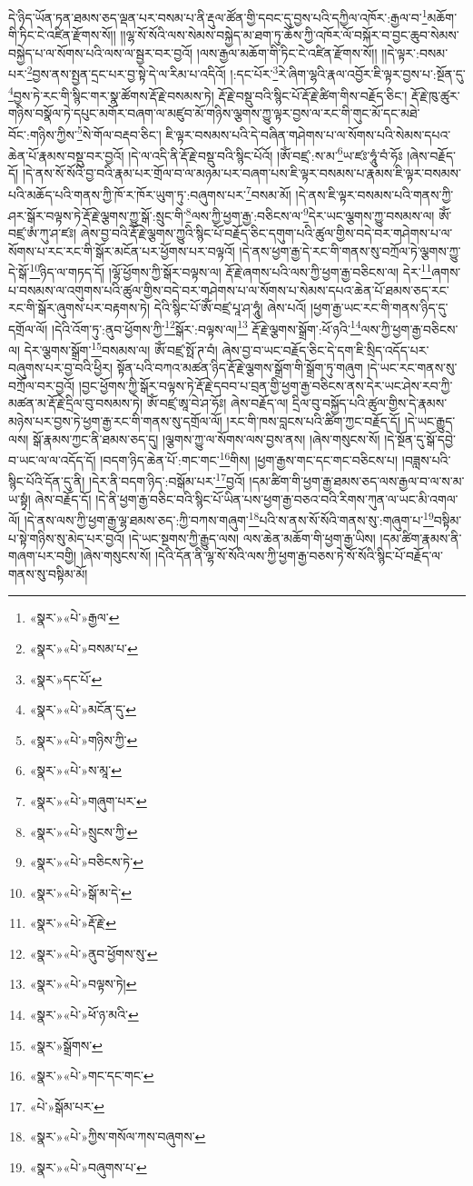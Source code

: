 དེ་ཉིད་ཡོན་ཏན་ཐམས་ཅད་ལྡན་པར་བསམ་པ་ནི་རྡུལ་ཚོན་གྱི་དབང་དུ་བྱས་པའི་དཀྱིལ་འཁོར་:རྒྱལ་བ་\footnote{«སྣར་»«པེ་»རྒྱལ་}མཆོག་གི་ཏིང་ངེ་འཛིན་རྫོགས་སོ།། །།ལྷ་སོ་སོའི་ལས་སེམས་བསྐྱེད་མ་ཐག་ཏུ་ཆོས་ཀྱི་འཁོར་ལོ་བསྐོར་བ་བྱང་ཆུབ་སེམས་བསྐྱེད་པ་ལ་སོགས་པའི་ལས་ལ་སྦྱར་བར་བྱའོ། །ལས་རྒྱལ་མཆོག་གི་ཏིང་ངེ་འཛིན་རྫོགས་སོ།། །།དེ་ལྟར་:བསམ་པར་\footnote{«སྣར་»«པེ་»བསམ་པ་}བྱས་ནས་སྤྱན་དྲང་པར་བྱ་སྟེ་དེ་ལ་རིམ་པ་འདིའོ། །:དང་པོར་\footnote{«སྣར་»དང་པོ་}རེ་ཞིག་ལྷའི་རྣལ་འབྱོར་ཇི་ལྟར་བྱས་པ་:སྔོན་དུ་\footnote{«སྣར་»«པེ་»མངོན་དུ་}བྱས་ཏེ་རང་གི་སྙིང་གར་སྣ་ཚོགས་རྡོ་རྗེ་བསམས་ཏེ། རྡོ་རྗེ་བསྡུ་བའི་སྙིང་པོ་རྡོ་རྗེ་ཚིག་གིས་བརྗོད་ཅིང་། རྡོ་རྗེ་ཁུ་ཚུར་གཉིས་བསྣོལ་ཏེ་དཔུང་མགོར་བཞག་ལ་མཛུབ་མོ་གཉིས་ལྕགས་ཀྱུ་ལྟར་བྱས་ལ་རང་གི་གུང་མོ་དང་མཐེ་བོང་:གཉིས་ཀྱིས་\footnote{«སྣར་»«པེ་»གཉིས་ཀྱི་}སེ་གོལ་བརྡབ་ཅིང་། ཇི་ལྟར་བསམས་པའི་དེ་བཞིན་གཤེགས་པ་ལ་སོགས་པའི་སེམས་དཔའ་ཆེན་པོ་རྣམས་བསྡུ་བར་བྱའོ། །དེ་ལ་འདི་ནི་རྡོ་རྗེ་བསྡུ་བའི་སྙིང་པོའོ། །ཨོཾ་བཛྲ་:ས་མ་\footnote{«སྣར་»«པེ་»ས་མཱ་}ཡ་ཛཿ་ཧཱུཾ་བཾ་ཧོཿ །ཞེས་བརྗོད་དོ། །དེ་ནས་སོ་སོའི་བྱ་བའི་རྣམ་པར་གྲོལ་བ་ལ་མཉམ་པར་བཞག་པས་ཇི་ལྟར་བསམས་པ་རྣམས་ཇི་ལྟར་བསམས་པའི་མཆོད་པའི་གནས་ཀྱི་ཁོ་ར་ཁོར་ཡུག་ཏུ་:བཞུགས་པར་\footnote{«སྣར་»«པེ་»གཞུག་པར་}བསམ་མོ། །དེ་ནས་ཇི་ལྟར་བསམས་པའི་གནས་ཀྱི་ཤར་སྒོར་བལྟས་ཏེ་རྡོ་རྗེ་ལྕགས་ཀྱུ་སྒོ་:སྲུང་གི་\footnote{«སྣར་»«པེ་»སྲུངས་ཀྱི་}ལས་ཀྱི་ཕྱག་རྒྱ་:བཅིངས་ལ་\footnote{«སྣར་»«པེ་»བཅིངས་ཏེ་}དེར་ཡང་ལྕགས་ཀྱུ་བསམས་ལ། ཨོཾ་བཛྲ་ཨཾ་ཀུ་ཤ་ཛཿ། ཞེས་བྱ་བའི་རྡོ་རྗེ་ལྕགས་ཀྱུའི་སྙིང་པོ་བརྗོད་ཅིང་དགུག་པའི་ཚུལ་གྱིས་བདེ་བར་གཤེགས་པ་ལ་སོགས་པ་རང་རང་གི་སྒོར་མངོན་པར་ཕྱོགས་པར་བལྟའོ། །དེ་ནས་ཕྱག་རྒྱ་དེ་རང་གི་གནས་སུ་བཀྲོལ་ཏེ་ལྕགས་ཀྱུ་དེ་སྒོ་\footnote{«སྣར་»«པེ་»སྒོ་མ་དེ་}ཉིད་ལ་གཏད་དོ། །ལྷོ་ཕྱོགས་ཀྱི་སྒོར་བལྟས་ལ། རྡོ་རྗེ་ཞགས་པའི་ལས་ཀྱི་ཕྱག་རྒྱ་བཅིངས་ལ། དེར་\footnote{«སྣར་»«པེ་»རྡོ་རྗེ་}ཞགས་པ་བསམས་ལ་འགུགས་པའི་ཚུལ་གྱིས་བདེ་བར་གཤེགས་པ་ལ་སོགས་པ་སེམས་དཔའ་ཆེན་པོ་ཐམས་ཅད་རང་རང་གི་སྒོར་ཞུགས་པར་བརྟགས་ཏེ། དེའི་སྙིང་པོ་ཨོཾ་བཛྲ་པཱ་ཤ་ཧཱུཾ། ཞེས་པའོ། །ཕྱག་རྒྱ་ཡང་རང་གི་གནས་ཉིད་དུ་དགྲོལ་ལོ། །དེའི་འོག་ཏུ་:ནུབ་ཕྱོགས་ཀྱི་\footnote{«སྣར་»«པེ་»ནུབ་ཕྱོགས་སུ་}སྒོར་:བལྟས་ལ།\footnote{«སྣར་»«པེ་»བལྟས་ཏེ།} རྡོ་རྗེ་ལྕགས་སྒྲོག་:ཕོ་ཉའི་\footnote{«སྣར་»«པེ་»ཕོ་ཉ་མའི་}ལས་ཀྱི་ཕྱག་རྒྱ་བཅིངས་ལ། དེར་ལྕགས་སྒྲོག་\footnote{«སྣར་»སྒྲོགས་}བསམས་ལ། ཨོཾ་བཛྲ་སྥོ་ཊ་བཾ། ཞེས་བྱ་བ་ཡང་བརྗོད་ཅིང་དེ་དག་ཇི་སྲིད་འདོད་པར་བཞུགས་པར་བྱ་བའི་ཕྱིར། སྟོན་པའི་བཀའ་མཚན་ཉིད་རྡོ་རྗེ་ལྕགས་སྒྲོག་གི་སྒྲོག་ཏུ་གཞུག །དེ་ཡང་རང་གནས་སུ་བཀྲོལ་བར་བྱའོ། །བྱང་ཕྱོགས་ཀྱི་སྒོར་བལྟས་ཏེ་རྡོ་རྗེ་དབབ་པ་བྲན་གྱི་ཕྱག་རྒྱ་བཅིངས་ནས་དེར་ཡང་ཤེས་རབ་ཀྱི་མཚན་མ་རྡོ་རྗེ་དྲིལ་བུ་བསམས་ཏེ། ཨོཾ་བཛྲ་ཨཱ་བེ་ཤ་ཧོཿ། ཞེས་བརྗོད་ལ། དྲིལ་བུ་བསྐྱོད་པའི་ཚུལ་གྱིས་དེ་རྣམས་མཉེས་པར་བྱས་ཏེ་ཕྱག་རྒྱ་རང་གི་གནས་སུ་དགྲོལ་ལོ། །རང་གི་ཁས་བླངས་པའི་ཚིག་ཀྱང་བརྗོད་དོ། །དེ་ཡང་རྒྱུད་ལས། སྒོ་རྣམས་ཀྱང་ནི་ཐམས་ཅད་དུ། །ལྕགས་ཀྱུ་ལ་སོགས་ལས་བྱས་ནས། །ཞེས་གསུངས་སོ། །དེ་སྔོན་དུ་སྒོ་དབྱེ་བ་ཡང་ལ་ལ་འདོད་དོ། །བདག་ཉིད་ཆེན་པོ་:གང་གང་\footnote{«སྣར་»«པེ་»གང་དང་གང་}གིས། །ཕྱག་རྒྱས་གང་དང་གང་བཅིངས་པ། །བཟླས་པའི་སྙིང་པོའི་དོན་དུ་ནི། །དེར་ནི་བདག་ཉིད་:བསྒོམ་པར་\footnote{«པེ་»སྒོམ་པར་}བྱའོ། །དམ་ཚིག་གི་ཕྱག་རྒྱ་ཐམས་ཅད་ལས་རྒྱལ་བ་ལ་ས་མ་ཡ་སྟྭཾ། ཞེས་བརྗོད་དོ། །དེ་ནི་ཕྱག་རྒྱ་བཅིང་བའི་སྙིང་པོ་ཡིན་པས་ཕྱག་རྒྱ་བཅའ་བའི་རིགས་ཀུན་ལ་ཡང་མི་འགལ་ལོ། །དེ་ནས་ལས་ཀྱི་ཕྱག་རྒྱ་ལྷ་ཐམས་ཅད་:ཀྱི་བཀས་གཞུག་\footnote{«སྣར་»«པེ་»ཀྱིས་གསོལ་ཀས་བཞུགས་}པའི་ས་ནས་སོ་སོའི་གནས་སུ་:གཞུག་པ་\footnote{«སྣར་»«པེ་»བཞུགས་པ་}བསྟིམ་པ་སྟེ་གཉིས་སུ་མེད་པར་བྱའོ། །དེ་ཡང་སྔགས་ཀྱི་རྒྱུད་ལས། ལས་ཆེན་མཆོག་གི་ཕྱག་རྒྱ་ཡིས། །དམ་ཚིག་རྣམས་ནི་གཞག་པར་བགྱི། །ཞེས་གསུངས་སོ། །དེའི་དོན་ནི་ལྷ་སོ་སོའི་ལས་ཀྱི་ཕྱག་རྒྱ་བཅས་ཏེ་སོ་སོའི་སྙིང་པོ་བརྗོད་ལ་གནས་སུ་བསྟིམ་མོ། 